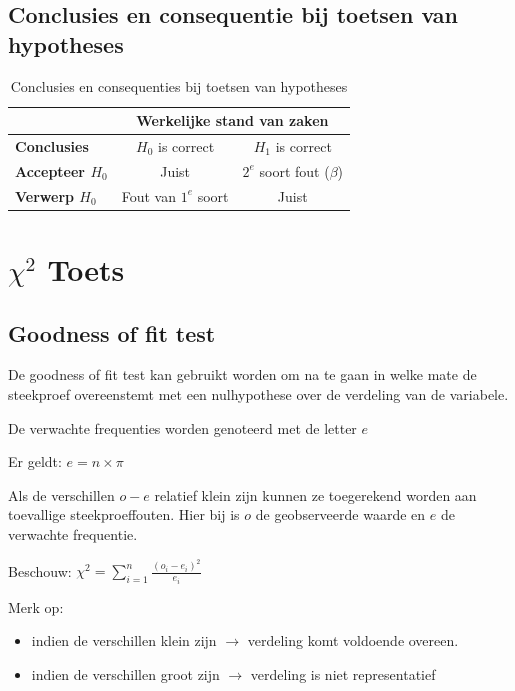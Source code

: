 \documentclass[a4paper,12pt]{article}
\begin{document}
\subsection{Conclusies en consequentie bij toetsen van hypotheses}
\begin{table}[H]
\centering
\begin{tabular}{l c c}

& \multicolumn{2}{c}{\textbf{Werkelijke stand van zaken}}\\
\hline
\textbf{Conclusies} & $H_0$ is correct & $H_1$ is correct \\
\textbf{Accepteer $H_0$} & Juist & $2^e$ soort fout ($\beta$)\\
\textbf{Verwerp $H_0$} & Fout van $1^e$ soort & Juist\\
\hline
\end{tabular}
\caption{Conclusies en consequenties bij toetsen van hypotheses}
\label{tab:conseqentiesToetsenHypotheses}
\end{table}

\section{$\chi^2$ Toets}
\subsection{Goodness of fit test}
De goodness of fit test kan gebruikt worden om na te gaan in welke mate de steekproef overeenstemt met een nulhypothese over de verdeling van de variabele.

De verwachte frequenties worden genoteerd met de letter $e$

Er geldt: $e=n\times \pi$

Als de verschillen $o-e$ relatief klein zijn kunnen ze toegerekend worden aan toevallige steekproeffouten.
Hier bij is $o$ de geobserveerde waarde en $e$ de verwachte frequentie.

Beschouw: $\chi^2=\sum^n_{i=1}\frac{(o_i-e_i)^2}{e_i}$

Merk op:

\begin{itemize}
\item indien de verschillen klein zijn $\rightarrow$ verdeling komt voldoende overeen.
\item indien de verschillen groot zijn $\rightarrow$ verdeling is niet representatief
\end{itemize}
\end{document}
